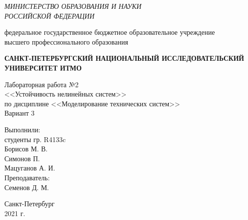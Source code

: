 \begin{titlepage}
    \begin{center}
        \textit{МИНИСТЕРСТВО ОБРАЗОВАНИЯ И НАУКИ\\
        РОССИЙСКОЙ ФЕДЕРАЦИИ}
        \vspace{1ex}

        федеральное государственное бюджетное образовательное учреждение\\
        высшего профессионального образования
        \vspace{1ex}

        \textbf{САНКТ-ПЕТЕРБУРГСКИЙ НАЦИОНАЛЬНЫЙ ИССЛЕДОВАТЕЛЬСКИЙ УНИВЕРСИТЕТ ИТМО}
        \vspace{13ex}

        Лабораторная работа №2\\
        <<Устойчивость нелинейных систем>>\\
        по дисциплине <<Моделирование технических систем>>\\
        \vspace{1em}
        Вариант 3\\
    \end{center}
    \vspace{14em}
    \begin{flushright}
        \noindent
        Выполнили:\\
        студенты гр. R4133c\\
        Борисов М. В.\\
        Симонов П.\\
        Мацуганов А. И.\\
        \vspace{1em}
        Преподаватель:\\
        Семенов Д. М.
    \end{flushright}
    \vfill
    \begin{center}
        \large{Санкт-Петербург}\\
        2021 г.\\
    \end{center}
\end{titlepage}

